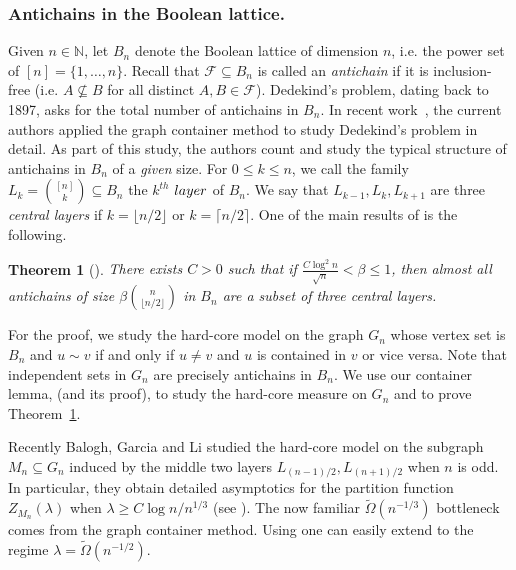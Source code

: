\documentclass[a4paper]{amsart}
\newtheorem{thm}{Theorem}[section]
\theoremstyle{definition}
\newcommand{\cF}{\mathcal{F} }
\newcommand{\0}[0]{\emptyset}
\newcommand{\lam}{\lambda}
\begin{document}
\subsubsection*{Antichains in the Boolean lattice.} Given $n\in\mathbb N$, let $B_n$ denote the Boolean lattice of dimension $n$, i.e. the power set of $[n]=\{1,\ldots,n\}$.
Recall that $\cF \subseteq B_n$ is called an \emph{antichain} if it is inclusion-free (i.e. $A \not \subseteq B$ for all distinct $A,B\in \cF$). Dedekind's problem, dating back to 1897, asks for the total number of antichains in $B_n$. In recent work~\cite{sparsesperner}, the current authors applied the graph container method to study Dedekind's problem in detail. As part of this study, the authors count and study the typical structure of antichains in $B_n$ of a \emph{given} size. For $0\leq k\leq n$, we call the family $L_k=\binom{[n]}{k}\subseteq B_n$ the $k^{th}$ $\emph{layer}$ of $B_n$. We say that $L_{k-1},L_{k}, L_{k+1}$ are three \emph{central layers} if $k=\lfloor n/2 \rfloor$ or $k= \lceil n/2 \rceil$.
One of the {main} results of \cite{sparsesperner} is the following.

\begin{thm}[{\cite[Theorem 1.5]{sparsesperner}}]\label{thm:antichain}
    There exists $C>0$ such that if  $\frac{C\log^2 n}{\sqrt{n}}<\beta\leq 1$, then almost all antichains of size $\beta \displaystyle \binom{n}{\lfloor n/2\rfloor}$ in $B_n$ are a subset of three central layers.
\end{thm}

For the proof, we study the hard-core model on the graph $G_n$ whose vertex set is $B_n$ and $u\sim v$ if and only if {$u\neq v$ and} $u$ is contained in $v$ or vice versa. Note that independent sets in $G_n$ are precisely antichains in $B_n$. We use our container lemma,  (and its proof), to study the hard-core measure on $G_n$ and to prove Theorem~\ref{thm:antichain}.

Recently Balogh, Garcia and Li \cite{balogh2021independent} studied the hard-core model on the subgraph $M_n\subseteq G_n$ induced by the middle two layers $L_{(n-1)/2}, L_{(n+1)/2}$ when $n$ is odd. In particular, they obtain detailed asymptotics for the partition function $Z_{M_n}(\lam)$ when $\lam\geq C \log n/n^{1/3}$ (see \cite[Theorem 5.1]{balogh2021independent}). The now familiar $\tilde\Omega(n^{-1/3})$ bottleneck comes from the graph container method. Using  one can easily extend \cite[Theorem 5.1]{balogh2021independent} to the regime $\lam= \tilde\Omega(n^{-1/2})$.
\end{document}
